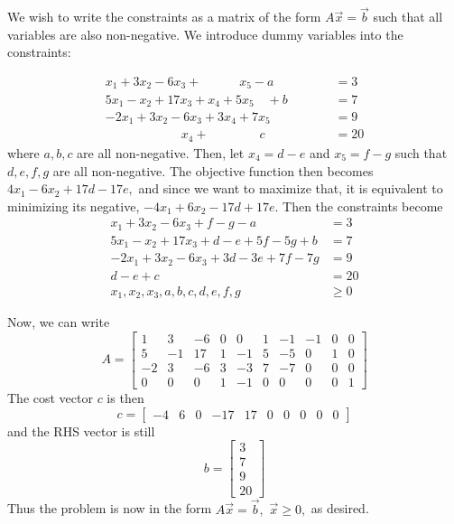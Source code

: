\documentclass{article}
\begin{document}
\begin{itemize}
\begin{enumerate}[a)]
			\begin{soln}
				We wish to write the constraints as a matrix of the form $A\vec{x}=\vec{b}$ such that all variables are also non-negative. We introduce dummy variables into the constraints:

				\begin{align*}
					x_1+3x_2-6x_3+\quad\quad\quad x_5 - a \quad\quad\quad\quad&= 3 \\
					5x_1-x_2+17x_3+x_4+5x_5\quad+ b \quad\quad&= 7 \\
					-2x_1+3x_2-6x_3+3x_4+7x_5\quad\quad \quad\quad&= 9 \\
					\quad\quad\quad\quad\quad\quad x_4 + \quad\quad\quad\quad  c &= 20
				\end{align*} where $a, b, c$ are all non-negative. Then, let $x_4 = d - e$ and $x_5=f - g$ such that $d, e, f, g$ are all non-negative. The objective function then becomes $4x_1-6x_2+17d-17e,$ and since we want to maximize that, it is equivalent to minimizing its negative, $-4x_1+6x_2-17d+17e.$ Then the constraints become 
				\begin{align*}
					x_1+3x_2-6x_3+f - g - a &= 3 \\
					5x_1-x_2+17x_3+d-e+5f-5g+b &= 7 \\
					-2x_1+3x_2-6x_3+3d-3e+7f-7g &= 9 \\
					d - e + c &= 20 \\
					x_1, x_2, x_3, a, b, c, d, e, f, g &\ge 0
				\end{align*} 

				Now, we can write \[A=\begin{bmatrix}
						1 & 3 & -6 & 0 & 0 & 1 & -1 & -1 & 0 & 0 \\
						5 & -1 & 17 & 1 & -1 & 5 & -5 & 0 & 1 & 0 \\
						-2 & 3 & -6 & 3 & -3 & 7 & -7 & 0 & 0 & 0 \\
						0 & 0 & 0 & 1 & -1 & 0 & 0 & 0 & 0 & 1
				\end{bmatrix} \] The cost vector $c$ is then \[c =\begin{bmatrix}
					-4 & 6 & 0 & -17 & 17 & 0 & 0 & 0 & 0 & 0
			\end{bmatrix}\] and the RHS vector is still \[b=\begin{bmatrix}
				3 \\ 7 \\ 9 \\ 20 \end{bmatrix}\] Thus the problem is now in the form $A\vec{x}=\vec{b},$ $\vec{x}\ge 0,$ as desired.


\end{soln}
\end{enumerate}
\end{itemize}
\end{document}
